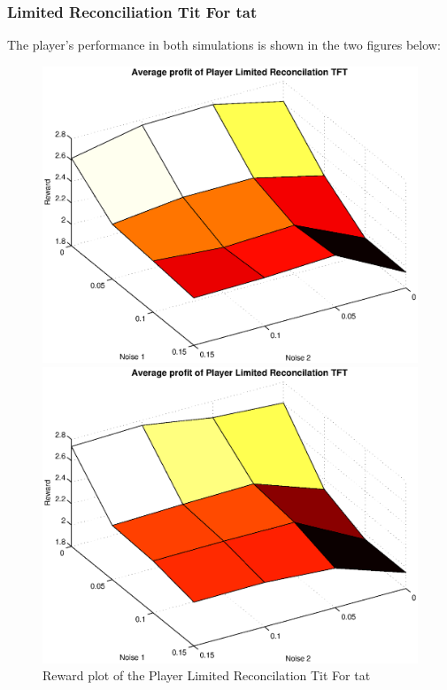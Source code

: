 \documentclass[11pt,twoside]{article}
\begin{document}
\subsubsection{Limited Reconciliation Tit For tat}
The player's performance in both simulations is shown in the two figures below:
\begin{figure}[h]

\begin{minipage}[hbt]{0.65\textwidth}
	\centering
	\includegraphics[width=\textwidth]{pics/simulation1/Reward_vs_Noise_of_Player_Limited_Reconcilation_TFT}
\end{minipage}
\hfill
\begin{minipage}[hbt]{0.3\textwidth}
	\centering
	\includegraphics[width=\textwidth]{pics/simulation2/Reward_vs_Noise_of_Player_Limited_Reconcilation_TFT}
\end{minipage}
	\caption{Reward plot of the Player Limited Reconcilation Tit For tat}
	\label{pic player lrtft}
\end{figure}
\end{document}
